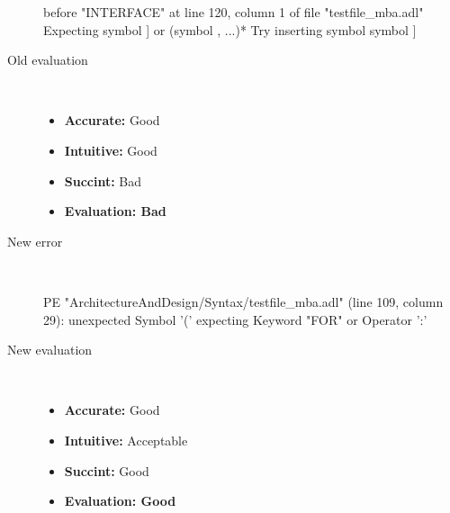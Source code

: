 \begin{description}
\begin{haskell}
before "INTERFACE" at line 120, column 1 of file "testfile_mba.adl"
Expecting symbol ] or (symbol , ...)*
Try inserting symbol symbol ]
\end{haskell}
  \item[Old evaluation]~\\
    \begin{itemize}
    \item \textbf{Accurate:} Good
    \item \textbf{Intuitive:} Good
    \item \textbf{Succint:} Bad
    \item \textbf{Evaluation: Bad}
    \end{itemize}
  \item[New error]~\\
\begin{haskell}
PE "ArchitectureAndDesign/Syntax/testfile_mba.adl" (line 109, column 29):
unexpected Symbol '('
expecting Keyword "FOR" or Operator ':'\end{haskell}
  \item[New evaluation]~\\
    \begin{itemize}
    \item \textbf{Accurate:} Good
    \item \textbf{Intuitive:} Acceptable
    \item \textbf{Succint:} Good
    \item \textbf{Evaluation: Good
}
    \end{itemize}
  \end{description}

\hrulefill


